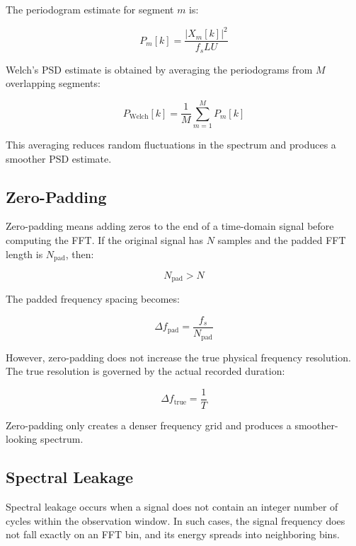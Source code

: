 \documentclass[11pt,a4paper]{article}
\begin{document}
The periodogram estimate for segment \(m\) is:

\begin{equation}
    P_m[k] =
    \frac{|X_m[k]|^2}{f_s L U}
\end{equation}

Welch's PSD estimate is obtained by averaging the periodograms from \(M\) overlapping segments:

\begin{equation}
    P_{\text{Welch}}[k] =
    \frac{1}{M}
    \sum_{m=1}^{M} P_m[k]
\end{equation}

This averaging reduces random fluctuations in the spectrum and produces a smoother PSD estimate.

\subsection{Zero-Padding}

Zero-padding means adding zeros to the end of a time-domain signal before computing the FFT. If the original signal has \(N\) samples and the padded FFT length is \(N_{\text{pad}}\), then:

\begin{equation}
    N_{\text{pad}} > N
\end{equation}

The padded frequency spacing becomes:

\begin{equation}
    \Delta f_{\text{pad}} =
    \frac{f_s}{N_{\text{pad}}}
\end{equation}

However, zero-padding does not increase the true physical frequency resolution. The true resolution is governed by the actual recorded duration:

\begin{equation}
    \Delta f_{\text{true}} =
    \frac{1}{T}
\end{equation}

Zero-padding only creates a denser frequency grid and produces a smoother-looking spectrum.

\subsection{Spectral Leakage}

Spectral leakage occurs when a signal does not contain an integer number of cycles within the observation window. In such cases, the signal frequency does not fall exactly on an FFT bin, and its energy spreads into neighboring bins.
\end{document}
